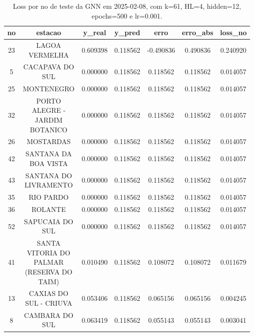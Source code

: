 \begin{table}[h]
\centering
\caption{Loss por no de teste da GNN em 2025-02-08, com k=61, HL=4, hidden=12, epochs=500 e lr=0.001.}
\label{tab:gnn_loss_k61_hl4_h12_e500_d20250208}
\begin{tabular}{ccccccc}
\toprule
no & estacao & y\_real & y\_pred & erro & erro\_abs & loss\_no \\
\midrule
23 & LAGOA VERMELHA & 0.609398 & 0.118562 & -0.490836 & 0.490836 & 0.240920 \\
5 & CACAPAVA DO SUL & 0.000000 & 0.118562 & 0.118562 & 0.118562 & 0.014057 \\
25 & MONTENEGRO & 0.000000 & 0.118562 & 0.118562 & 0.118562 & 0.014057 \\
32 & PORTO ALEGRE - JARDIM BOTANICO & 0.000000 & 0.118562 & 0.118562 & 0.118562 & 0.014057 \\
26 & MOSTARDAS & 0.000000 & 0.118562 & 0.118562 & 0.118562 & 0.014057 \\
42 & SANTANA DA BOA VISTA & 0.000000 & 0.118562 & 0.118562 & 0.118562 & 0.014057 \\
43 & SANTANA DO LIVRAMENTO & 0.000000 & 0.118562 & 0.118562 & 0.118562 & 0.014057 \\
35 & RIO PARDO & 0.000000 & 0.118562 & 0.118562 & 0.118562 & 0.014057 \\
36 & ROLANTE & 0.000000 & 0.118562 & 0.118562 & 0.118562 & 0.014057 \\
52 & SAPUCAIA DO SUL & 0.000000 & 0.118562 & 0.118562 & 0.118562 & 0.014057 \\
41 & SANTA VITORIA DO PALMAR (RESERVA DO TAIM) & 0.010490 & 0.118562 & 0.108072 & 0.108072 & 0.011679 \\
13 & CAXIAS DO SUL - CRIUVA & 0.053406 & 0.118562 & 0.065156 & 0.065156 & 0.004245 \\
8 & CAMBARA DO SUL & 0.063419 & 0.118562 & 0.055143 & 0.055143 & 0.003041 \\
\bottomrule
\end{tabular}
\end{table}

